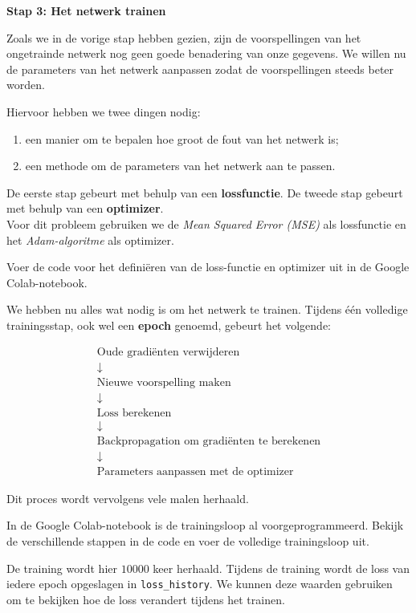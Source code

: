 \documentclass{ximera}
\begin{document}
\begin{question} \textbf{Stap 3: Het netwerk trainen}

Zoals we in de vorige stap hebben gezien, zijn de voorspellingen van het ongetrainde netwerk nog geen goede benadering van onze gegevens. We willen nu de parameters van het netwerk aanpassen zodat de voorspellingen steeds beter worden.

Hiervoor hebben we twee dingen nodig:

\begin{enumerate}
    \item een manier om te bepalen hoe groot de fout van het netwerk
    is;
    \item een methode om de parameters van het netwerk aan te passen.
\end{enumerate}

De eerste stap gebeurt met behulp van een \textbf{lossfunctie}. De tweede stap gebeurt met behulp van een \textbf{optimizer}. \\
Voor dit probleem gebruiken we de \textit{Mean Squared Error (MSE)} als lossfunctie en het \textit{Adam-algoritme} als optimizer.

Voer de code voor het definiëren van de loss-functie en optimizer uit in de Google Colab-notebook. 

We hebben nu alles wat nodig is om het netwerk te trainen. Tijdens één volledige trainingsstap, ook wel een \textbf{epoch} genoemd, gebeurt het volgende:

\[
\boxed{
\begin{array}{c}
\text{Oude gradiënten verwijderen}\\
\downarrow\\
\text{Nieuwe voorspelling maken}\\
\downarrow\\
\text{Loss berekenen}\\
\downarrow\\
\text{Backpropagation om gradiënten te berekenen}\\
\downarrow\\
\text{Parameters aanpassen met de optimizer}
\end{array}}
\]

Dit proces wordt vervolgens vele malen herhaald.

In de Google Colab-notebook is de trainingsloop al voorgeprogrammeerd. Bekijk de verschillende stappen in de code en voer de volledige trainingsloop uit.

De training wordt hier $10000$ keer herhaald. Tijdens de training wordt de loss van iedere epoch opgeslagen in \texttt{loss\_history}. We kunnen deze waarden gebruiken om te bekijken hoe de loss verandert tijdens het trainen.


\end{question}
\end{document}
